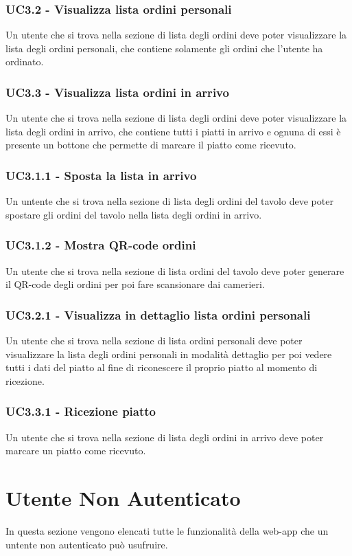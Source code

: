 \subsubsection{UC3.2 - Visualizza lista ordini personali}
Un utente che si trova nella sezione di lista degli ordini deve poter visualizzare la lista degli ordini personali, che contiene solamente gli ordini che l'utente ha ordinato.
\subsubsection{UC3.3 - Visualizza lista ordini in arrivo}
Un utente che si trova nella sezione di lista degli ordini deve poter visualizzare la lista degli ordini in arrivo, che contiene tutti i piatti in arrivo e ognuna di essi è presente un bottone che permette di marcare il piatto come ricevuto.
\subsubsection{UC3.1.1 - Sposta la lista in arrivo}
Un untente che si trova nella sezione di lista degli ordini del tavolo deve poter spostare gli ordini del tavolo nella lista degli ordini in arrivo.
\subsubsection{UC3.1.2 - Mostra QR-code ordini}
Un utente che si trova nella sezione di lista ordini del tavolo deve poter generare il QR-code degli ordini per poi fare scansionare dai camerieri.
\subsubsection{UC3.2.1 - Visualizza in dettaglio lista ordini personali}
Un utente che si trova nella sezione di lista ordini personali deve poter visualizzare la lista degli ordini personali in modalità dettaglio per poi vedere tutti i dati del piatto al fine di riconescere il proprio piatto al momento di ricezione.
\subsubsection{UC3.3.1 - Ricezione piatto}
Un utente che si trova nella sezione di lista degli ordini in arrivo deve poter marcare un piatto come ricevuto.
\section{Utente Non Autenticato}
In questa sezione vengono elencati tutte le funzionalità della web-app che un untente non autenticato può usufruire.
